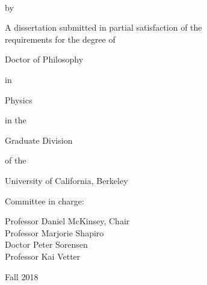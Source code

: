 
\begin{titlepage}

\begin{center}
\large

\hfill
\vfill


\myTitle \\ \bigskip

by \\ \bigskip

\myName

\vfill

A dissertation submitted in partial satisfaction of the \\
requirements for the degree of \\ \bigskip

Doctor of Philosophy \\ \smallskip

in \\ \smallskip

Physics \\ \smallskip

in the \\ \smallskip

Graduate Division \\ \smallskip

of the \\ \smallskip

University of California, Berkeley


\vfill

Committee in charge: \\ \smallskip

Professor Daniel McKinsey, Chair \\
Professor Marjorie Shapiro \\
Doctor Peter Sorensen \\
Professor Kai Vetter \\ \bigskip\bigskip

Fall 2018

\end{center}

\end{titlepage}